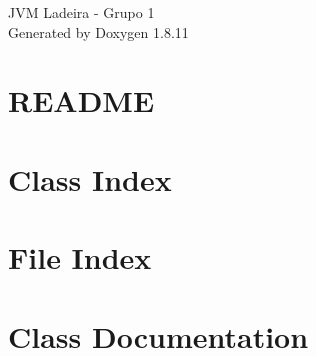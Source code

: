 \documentclass[twoside]{book}
\newcommand{\+}{\discretionary{\mbox{\scriptsize$\hookleftarrow$}}{}{}}
\newcommand{\clearemptydoublepage}{%
  \newpage{\pagestyle{empty}\cleardoublepage}%
}
\begin{document}
\hypersetup{pageanchor=false,
             bookmarksnumbered=true,
             pdfencoding=unicode
            }
\begin{titlepage}
\vspace*{7cm}
\begin{center}%
{\Large J\+VM Ladeira -\/ Grupo 1 }\\
\vspace*{1cm}
{\large Generated by Doxygen 1.8.11}\\
\end{center}
\end{titlepage}
\clearemptydoublepage
\tableofcontents
\clearemptydoublepage
{}
\hypersetup{pageanchor=true}

\chapter{R\+E\+A\+D\+ME}
\label{md_README}
\hypertarget{md_README}{}

\chapter{Class Index}

\chapter{File Index}

\chapter{Class Documentation}







































\end{document}
